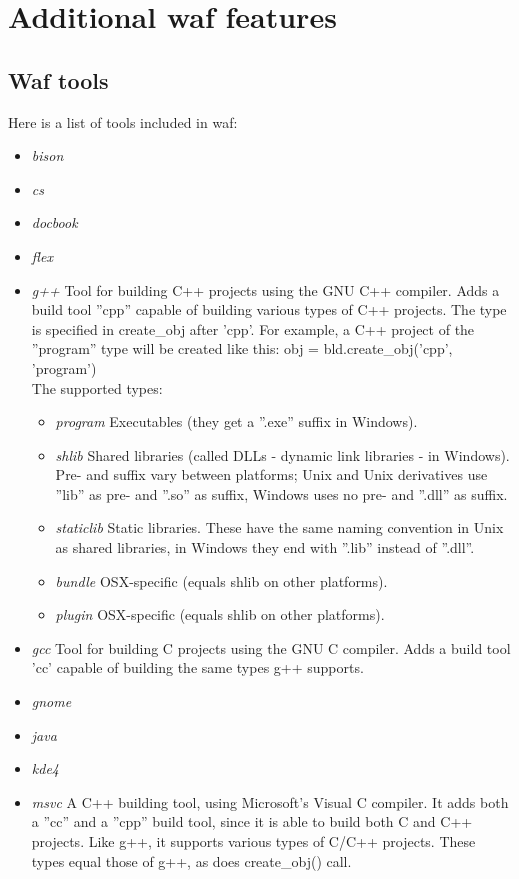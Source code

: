 \documentclass[a4paper,10pt]{article}
\begin{document}
\section{Additional waf features}

\subsection{Waf tools}
Here is a list of tools included in waf:
\begin{itemize}
	\item \emph{bison}
	\item \emph{cs}
	\item \emph{docbook}
	\item \emph{flex}
	\item \emph{g++}
		Tool for building C++ projects using the GNU C++ compiler. Adds a build tool ''cpp'' capable of building various types of C++ projects. The type is specified in create\_obj after 'cpp'. For example, a C++ project of the ''program'' type will be created like this: obj = bld.create\_obj('cpp', 'program')\\
		The supported types:
		\begin{itemize}
			\item \emph{program} Executables (they get a ''.exe'' suffix in Windows).
			\item \emph{shlib} Shared libraries (called DLLs - dynamic link libraries - in Windows). Pre- and suffix vary between platforms; Unix and Unix derivatives use ''lib'' as pre- and ''.so'' as suffix, Windows uses no pre- and ''.dll'' as suffix.
			\item \emph{staticlib} Static libraries. These have the same naming convention in Unix as shared libraries, in Windows they end with ''.lib'' instead of ''.dll''.
			\item \emph{bundle} OSX-specific (equals shlib on other platforms).
			\item \emph{plugin} OSX-specific (equals shlib on other platforms).
		\end{itemize}
	\item \emph{gcc}
		Tool for building C projects using the GNU C compiler. Adds a build tool 'cc' capable of building the same types g++ supports.
	\item \emph{gnome}
	\item \emph{java}
	\item \emph{kde4}
	\item \emph{msvc}
		A C++ building tool, using Microsoft's Visual C compiler. It adds both a ''cc'' and a ''cpp'' build tool, since it is able to build both C and C++ projects. Like g++, it supports various types of C/C++ projects. These types equal those of g++, as does create\_obj() call.\\

\end{itemize}
\end{document}
